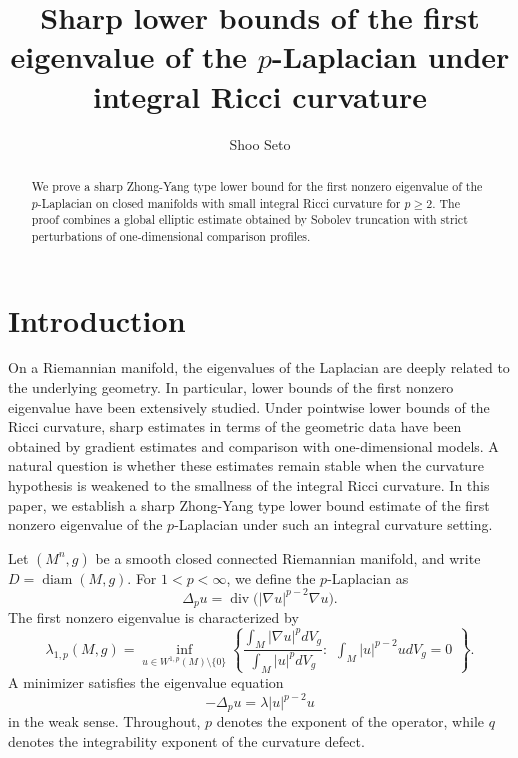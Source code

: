 \documentclass[11pt]{amsart}
\title[$p$-Laplace eigenvalue lower bound]{Sharp lower bounds of the first eigenvalue of the $p$-Laplacian under integral Ricci curvature}
\author{Shoo Seto}
\DeclareMathOperator{\diam}{diam}
\DeclareMathOperator{\diver}{div}
\theoremstyle{definition}
\begin{document}
\begin{abstract}
    We prove a sharp Zhong-Yang type lower bound for the first nonzero eigenvalue of the $p$-Laplacian on closed manifolds with small integral Ricci curvature for $p \geq 2$.  The proof combines a global elliptic estimate obtained by Sobolev truncation with strict perturbations of one-dimensional comparison profiles.
\end{abstract}
\maketitle

\section{Introduction}
On a Riemannian manifold, the eigenvalues of the Laplacian are deeply related to the underlying geometry.  In particular, lower bounds of the first nonzero eigenvalue have been extensively studied.  Under pointwise lower bounds of the Ricci curvature, sharp estimates in terms of the geometric data have been obtained by gradient estimates and comparison with one-dimensional models. A natural question is whether these estimates remain stable when the curvature hypothesis is weakened to the smallness of the integral Ricci curvature. In this paper, we establish a sharp Zhong-Yang type lower bound estimate of the first nonzero eigenvalue of the $p$-Laplacian under such an integral curvature setting.

Let $(M^n,g)$ be a smooth closed connected Riemannian manifold, and write $D=\diam(M,g)$. For $1<p<\infty$, we define the $p$-Laplacian as
\[
  \Delta_p u=\diver\bigl(|\nabla u|^{p-2}\nabla u\bigr).
\]
The first nonzero eigenvalue is characterized by
\begin{equation}\label{eq:variational}
 \lambda_{1,p}(M,g)=
 \inf_{u\in W^{1,p}(M)\setminus\{0\}}\left\{
 \frac{\int_M|\nabla u|^p dV_g}{\int_M|u|^pd V_g}:
 \begin{array}{l}
 \int_M|u|^{p-2}u d V_g=0
 \end{array}\right\}.
\end{equation}
A minimizer satisfies the eigenvalue equation
\begin{equation}\label{plaplaceeigen}
    -\Delta_pu=\lambda|u|^{p-2}u
\end{equation}in the weak sense. Throughout, $p$ denotes the exponent of the operator, while $q$ denotes the integrability exponent of the curvature defect.
\end{document}
